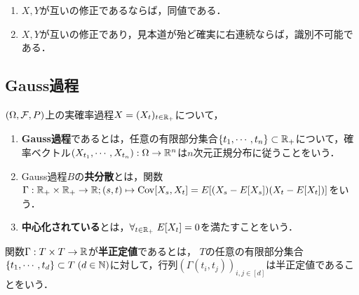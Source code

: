 \documentclass[uplatex,dvipdfmx]{jsreport}
\begin{document}
\begin{lemma}\mbox{}
    \begin{enumerate}
        \item $X,Y$が互いの修正であるならば，同値である．
        \item $X,Y$が互いの修正であり，見本道が殆ど確実に右連続ならば，識別不可能である．
    \end{enumerate}
\end{lemma}

\subsection{Gauss過程}

\begin{definition}
    $(\Omega,\mathcal{F},P)$上の実確率過程$X=(X_t)_{t\in\mathbb{R}_+}$について，
    \begin{enumerate}
        \item \textbf{Gauss過程}であるとは，任意の有限部分集合$\{t_1,\cdots,t_n\}\subset \mathbb{R}_+$について，確率ベクトル$(X_{t_1},\cdots,X_{t_n}):\Omega\to\mathbb{R}^n$は$n$次元正規分布に従うことをいう．
        \item Gauss過程$B$の\textbf{共分散}とは，関数$\Gamma:\mathbb{R}_+\times\mathbb{R}_+\to\mathbb{R};(s,t)\mapsto\mathrm{Cov}[X_s,X_t]=E[(X_s-E[X_s])(X_t-E[X_t])]$をいう．
        \item \textbf{中心化されている}とは，$\forall_{t\in\mathbb{R}_+}\;E[X_t]=0$を満たすことをいう．
    \end{enumerate}
\end{definition}

\begin{definition}
    関数$\Gamma:T\times T\to\mathbb{R}$が\textbf{半正定値}であるとは，
    $T$の任意の有限部分集合$\{t_1,\cdots,t_d\}\subset T\;(d\in\mathbb{N})$に対して，行列$(\Gamma(t_i,t_j))_{i,j\in[d]}$は半正定値であることをいう．
\end{definition}
\end{document}

